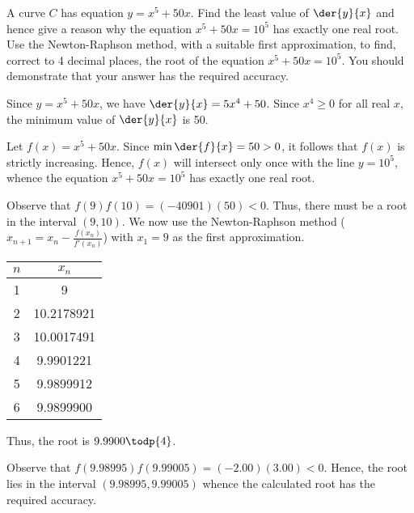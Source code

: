 \begin{problem}
    A curve $C$ has equation $y = x^5 + 50x$. Find the least value of $\der{y}{x}$ and hence give a reason why the equation $x^5+50x=10^5$ has exactly one real root. Use the Newton-Raphson method, with a suitable first approximation, to find, correct to 4 decimal places, the root of the equation $x^5+50x=10^5$. You should demonstrate that your answer has the required accuracy.
\end{problem}
\begin{solution}
    Since $y = x^5 + 50x$, we have $\der{y}{x} = 5x^4 + 50$. Since $x^4 \geq 0$ for all real $x$, the minimum value of $\der{y}{x}$ is 50.

    Let $f(x) = x^5 + 50x$. Since $\min \der{f}{x} = 50 > 0$, it follows that $f(x)$ is strictly increasing. Hence, $f(x)$ will intersect only once with the line $y = 10^5$, whence the equation $x^5 + 50x = 10^5$ has exactly one real root.

    Observe that $f(9)f(10) = (-40901)(50) < 0$. Thus, there must be a root in the interval $(9, 10)$. We now use the Newton-Raphson method ($x_{n+1} = x_n - \frac{f(x_n)}{f'(x_n)}$) with $x_1 = 9$ as the first approximation.
    \begin{table}[H]
        \centering
        \begin{tabular}{|c|c|}
        \hline
        $n$ & $x_n$ \\ \hline
        1 & 9 \\ \hline
        2 & 10.2178921 \\ \hline
        3 & 10.0017491 \\ \hline
        4 & 9.9901221 \\ \hline
        5 & 9.9899912 \\ \hline
        6 & 9.9899900 \\ \hline
        \end{tabular}
    \end{table}
    Thus, the root is $9.9900 \todp{4}$.

    Observe that $f(9.98995)f(9.99005) = (-2.00)(3.00) < 0$. Hence, the root lies in the interval $(9.98995, 9.99005)$ whence the calculated root has the required accuracy.
\end{solution}

